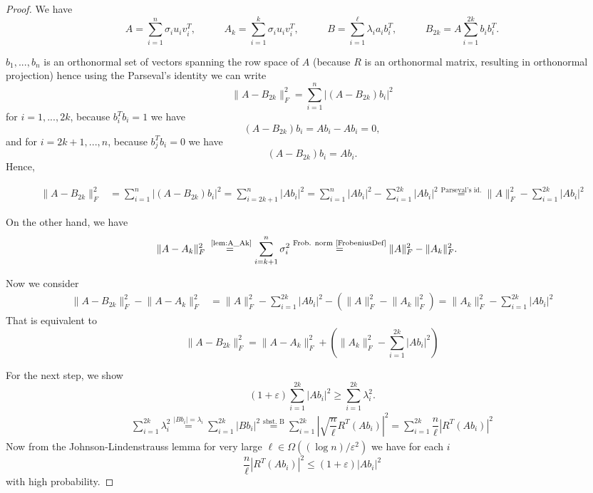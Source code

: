 \documentclass[a4paper,11pt,DIV=15]{scrartcl} %
\renewcommand{\epsilon}{\varepsilon}
\theoremstyle{plain}
\theoremstyle{definition}
\begin{document}
\begin{proof}
We have 
\[
A = \sum_{i=1}^n \sigma_i u_i v_i^T, \,\,\,\,\,\,\,\,\,\,\,\,\,\,\,\,\,A_k = \sum_{i=1}^k \sigma_i u_i v_i^T,  \,\,\,\,\,\,\,\,\,\,\,\,\,\,\,\,\, B=\sum_{i=1}^{\ell} \lambda_i a_i b_i^T,\,\,\,\,\,\,\,\,\,\,\,\,\,\,\,\,\, B_{2k} = A \sum_{i=1}^{2k} b_ib_i^T.
\]


$b_1,...,b_n$ is an orthonormal set of vectors spanning the row space of $A$ (because $R$ is an orthonormal matrix, resulting in orthonormal projection) hence using the Parseval's identity we can write
\[
 \lVert A - B_{2k} \rVert_F^2 = \sum_{i=1}^n |(A - B_{2k})b_i|^2
\]
for $i = 1,...,2k$, because $b_i^Tb_i = 1$ we have
\[
(A - B_{2k})b_i = Ab_i - Ab_i = 0,
\]
and for  $i = 2k+1,...,n$, because $b_j^Tb_i = 0$ we have
\[
(A - B_{2k})b_i = Ab_i.
\]
Hence,

\begin{align*}
    \lVert A - B_{2k} \rVert_F^2 &= \sum_{i=1}^n |(A - B_{2k})b_i|^2 = \sum_{i=2k+1}^n |A b_i|^2 = \sum_{i=1}^n |A b_i|^2 - \sum_{i=1}^{2k} |A b_i|^2 \overset{\text{Parseval's id.}}{=} \lVert A \rVert_F^2 - \sum_{i=1}^{2k} |A b_i|^2 
\end{align*}

On the other hand, we have
\begin{align*}
 \lVert A - A_k \rVert_F^2 &\overset{\text{ \cref{lem:A_Ak}}}{=} \sum_{i=k+1}^n \sigma_i^2  \overset{\text{Frob. norm \cite{FrobeniusDef}}}{=}  \lVert A \rVert_F^2 - \lVert A_k \rVert_F^2. 
\end{align*}

Now we consider 
\begin{align*}
   \lVert A - B_{2k} \rVert_F^2 - \lVert A - A_k \rVert_F^2 &= \lVert A \rVert_F^2 - \sum_{i=1}^{2k} |A b_i|^2  - (\lVert A \rVert_F^2 - \lVert A_k \rVert_F^2) = \lVert A_k \rVert_F^2 - \sum_{i=1}^{2k} |A b_i|^2
\end{align*}
That is equivalent to
\begin{equation}
   \lVert A - B_{2k} \rVert_F^2 = \lVert A - A_k \rVert_F^2 + (\lVert A_k \rVert_F^2 - \sum_{i=1}^{2k} |A b_i|^2)  \label{eq:A} 
\end{equation}



For the next step, we show
\[
(1+\epsilon) \sum_{i=1}^{2k} |A b_i|^2 \geq \sum_{i=1}^{2k} \lambda_i^2.
\]
\begin{align*}
    \sum_{i=1}^{2k} \lambda_i^2 \overset{|Bb_i| = \lambda_i}{=}\sum_{i=1}^{2k}|Bb_i|^2 
    \overset{\text{sbst. B}}{=} \sum_{i=1}^{2k} \left| \sqrt{\dfrac{n}{\ell}} R^T (Ab_i)\right|^2
    = \sum_{i=1}^{2k} \dfrac{n}{\ell}\left| R^T (Ab_i)\right|^2
\end{align*}
Now from the Johnson-Lindenstrauss lemma \cite{johnson1984Lindenstrauss} for very large $\ell \in \Omega((\log n)/\epsilon^2)$ we have for each $i$
\[
 \dfrac{n}{\ell}| R^T (Ab_i)|^2 \leq (1+\epsilon) |Ab_i|^2
\]
with high probability.


\end{proof}
\end{document}
